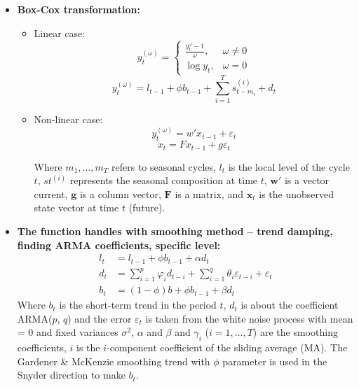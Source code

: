 \documentclass{ieeeojies}
\begin{document}
\begin{itemize}
    \item \textbf{Box-Cox transformation:}
    \begin{itemize}
        \item Linear case:
        \[
        y_t^{(\omega)} =
        \begin{cases}
        \frac{y_t^\omega - 1}{\omega}, & \omega \neq 0 \\
        \log y_t, & \omega = 0
        \end{cases}
        \]
        \[
    y_t^{(\omega)} = l_{t-1} + \phi b_{t-1} + \sum_{i=1}^{T} s_{t-m_i}^{(i)} + d_t
    \]
        
        \item Non-linear case:
        \[
        y_t^{(\omega)} = w' x_{t-1} + \varepsilon_t
        \]
        \[
        x_t = F x_{t-1} + g \varepsilon_t
        \]

        Where \( m_1, \ldots, m_T \) refers to seasonal cycles, \( l_t \) is the local level of the cycle \( t \), \( st^(i) \) represents the seasonal composition at time \( t \), \( \mathbf{w'} \) is a vector current, \( \mathbf{g} \) is a column vector, \( \mathbf{F} \) is a matrix, and \( \mathbf{x}_t \) is the unobserved state vector at time \( t \) (future). 
    \end{itemize}
    \item \textbf{The function handles with smoothing method – trend damping, finding ARMA coefficients, specific level:}
    \begin{align*}
    l_t &= l_{t-1} + \phi b_{t-1} + \alpha d_t \\
    d_t &= \sum_{i=1}^{p} \varphi_i d_{t-i} + \sum_{i=1}^{q} \theta_i \varepsilon_{t-i} + \varepsilon_t \\
    b_t &= (1 - \phi)b + \phi b_{t-1} + \beta d_t
    \end{align*}
    Where \( b_t \) is the short-term trend in the period \( t \), \( d_t \) is about the coefficient ARMA(\( p \), \( q \)) and the error \( \varepsilon_t \) is taken from the white noise process with mean = 0 and fixed variances \( \sigma^2 \), \( \alpha \) and \( \beta \) and \( \gamma_i \) (\( i = 1, \ldots, T \)) are the smoothing coefficients, \( i \) is the \( i \)-component coefficient of the sliding average (MA). The Gardener & McKenzie smoothing trend with \( \phi \) parameter is used in the Snyder direction to make \( b_t \).


\end{itemize}
\end{document}
